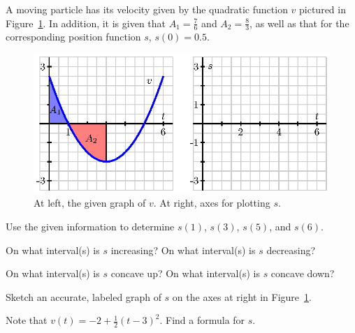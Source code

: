 \begin{exercises} 
  \item A moving particle has its velocity given by the quadratic function $v$ pictured in Figure~\ref{F:5.1.Ez1}.  In addition, it is given that $A_1 = \frac{7}{6}$ and $A_2 = \frac{8}{3}$, as well as that for the corresponding position function $s$, $s(0) = 0.5$.
  \begin{figure}[h]
\begin{center}
\includegraphics{figures/5_1_Ez1.eps}
\caption{At left, the given graph of $v$.  At right, axes for plotting $s$.} \label{F:5.1.Ez1}
\end{center}
\end{figure}
	\ba
		\item Use the given information to determine $s(1)$, $s(3)$, $s(5)$, and $s(6)$.
		\item On what interval(s) is $s$ increasing?  On what interval(s) is $s$ decreasing?
		\item On what interval(s) is $s$ concave up?  On what interval(s) is $s$ concave down?
		\item Sketch an accurate, labeled graph of $s$ on the axes at right in Figure~\ref{F:5.1.Ez1}.
		\item Note that $v(t) = -2 + \frac{1}{2}(t-3)^2$.  Find a formula for $s$.
	\ea
	

\end{exercises}
